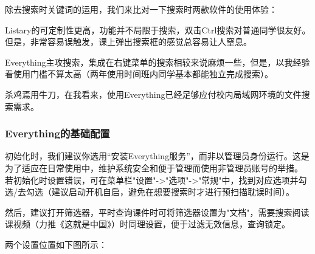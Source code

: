 \documentclass{article}
\begin{document}
            除去搜索时关键词的运用，我们来比对一下搜索时两款软件的使用体验：

            Listary的可定制性更高，功能并不局限于搜索，双击Ctrl搜索对普通同学很友好。但是，非常容易误触发，课上弹出搜索框的感觉总容易让人窒息。

            Everything主攻搜索，集成在右键菜单的搜索相较来说麻烦一些，但是，以我经验看使用门槛不算太高（两年使用时间班内同学基本都能独立完成搜索）。

            杀鸡焉用牛刀，在我看来，使用Everything已经足够应付校内局域网环境的文件搜索需求。
        \subsubsection{Everything的基础配置}
            初始化时，我们建议你选用“安装Everything服务”，而非以管理员身份运行。这是为了适应在日常使用中，维护系统安全和便于管理而使用非管理员账号的举措。
            若初始化时设置错误，可在菜单栏"设置"->"选项"->"常规"中，找到对应选项并勾选/去勾选（建议启动开机自启，避免在想要搜索时才进行预扫描耽误时间）。
            
            然后，建议打开筛选器，平时查询课件时可将筛选器设置为"文档"，需要搜索阅读课视频（力推《这就是中国》）时同理设置，便于过滤无效信息，查询锁定。

            两个设置位置如下图所示：
\end{document}
